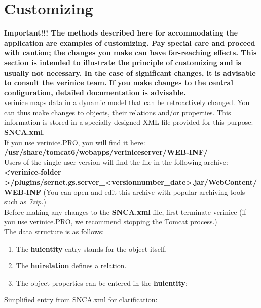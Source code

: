 \documentclass[a4paper,10pt]{book}
\begin{document}
\chapter{Customizing}
\textbf{Important!!! The methods described here for accommodating the application are examples of customizing.
Pay special care and proceed with caution; the changes you make can have far-reaching effects. This section is
intended to illustrate the principle of customizing and is usually not necessary. In the case of significant
changes, it is advisable to consult the verinice team. If you make changes to the central configuration,
detailed documentation is advisable.}
\newline\\
verinice maps data in a dynamic model that can be retroactively changed. You can thus make changes to objects,
their relations and/or properties. This information is stored in a specially designed XML file provided for this purpose:
\textbf{SNCA.xml}.
\newline\\
If you use verinice.PRO, you will find it here: \textbf{/usr/share/tomcat6/webapps/veriniceserver/WEB-INF/}
\newline\\
Users of the single-user version will find the file in the following archive:
\textbf{\textless verinice-folder \textgreater/plugins/sernet.gs.server\allowbreak\_\textless versionnumber\_date\textgreater.jar\allowbreak/WebContent/WEB-INF}
(You can open and edit this archive with popular archiving tools such as {\em 7zip.})
\newline\\
Before making any changes to the \textbf{SNCA.xml} file, first terminate verinice (if you use verinice.PRO, we recommend stopping the
Tomcat process.)
\newline\\
The data structure is as follows:
\begin{enumerate}
\item The \textbf{huientity} entry stands for the object itself.
\item The \textbf{huirelation} defines a relation.
\item The object properties can be entered in the \textbf{huientity}:
\end{enumerate}
Simplified entry from SNCA.xml for clarification:
\newline\\
\end{document}
